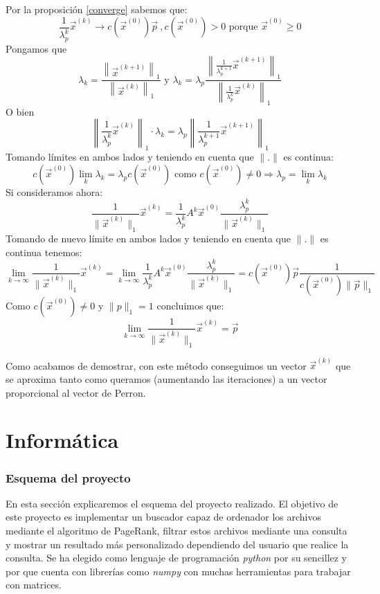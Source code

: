 \documentclass[size=a4, parskip=half, titlepage=false, toc=flat, toc=bib, 12pt]{scrartcl}
\theoremstyle{theorem-style}
\theoremstyle{definition-style}
\theoremstyle{remark-style}
\theoremstyle{example-style}
\theoremstyle{definition-style}
\theoremstyle{remark-style}
\begin{document}
Por la proposición \ref{converge} sabemos que:
$$\frac{1}{\lambda_p^k} \vec{x}^{(k)} \rightarrow c(\vec{x}^{(0)})\vec{p} \ , c(\vec{x}^{(0)}) > 0 \textrm{ porque } \vec{x}^{(0)} \geq 0$$
Pongamos que
$$\lambda_k = \frac{\left\|\vec{x}^{(k+1)}\right\|_1}{\left\|\vec{x}^{(k)}\right\|_1} \textrm{ y } \lambda_k = \lambda_p \frac{\left\|\frac{1}{\lambda_p^{k+1}} \vec{x}^{(k+1)}\right\|_1}{\left\|\frac{1}{\lambda_p^k} \vec{x}^{(k)}\right\|_1}$$
O bien
$$\left\|\frac{1}{\lambda_p^k} \vec{x}^{(k)} \right\|_1 \cdot \lambda_k  = \lambda_p \left\| \frac{1}{\lambda_p^{k+1}} \vec{x}^{(k+1)} \right\|_1$$
Tomando límites en ambos lados y teniendo en cuenta que $\|.\|$ es continua:
$$c(\vec{x}^{(0)}) \lim_{k} \lambda_k = \lambda_p c(\vec{x}^{(0)}) \textrm{ como } c(\vec{x}^{(0)}) \neq 0  \Rightarrow \lambda_p = \lim_{k} \lambda_k $$
Si consideramos ahora:
$$\frac{1}{\|\vec{x}^{(k)}\|_1} \vec{x}^{(k)}= \frac{1}{\lambda_p^{k}} A^k \vec{x}^{(0)} \frac{\lambda_p^k}{\|\vec{x}^{(k)}\|_1} $$
Tomando de nuevo límite en ambos lados y teniendo en cuenta que $\|. \|$ es continua tenemos:
$$\lim_{k \to \infty} \frac{1}{\|\vec{x}^{(k)}\|_1} \vec{x}^{(k)}= \lim_{k \to \infty} \frac{1}{\lambda_p^k} A^k \vec{x}^{(0)} \frac{\lambda_p^k}{\|\vec{x}^{(k)}\|_1} = c(\vec{x}^{(0)}) \vec{p} \frac{1}{c(\vec{x}^{(0)}) \|\vec{p}\|_1} $$
Como $c(\vec{x}^{(0)}) \neq 0$ y $\|p \|_1 = 1$ concluimos que:
$$\lim_{k \to \infty} \frac{1}{\|\vec{x}^{(k)}\|_1} \vec{x}^{(k)} = \vec{p} $$

Como acabamos de demostrar, con este método conseguimos un vector $\vec{x}^{(k)}$ que se aproxima tanto como queramos (aumentando las iteraciones) a un vector proporcional al vector de Perron.

\newpage

\part{Informática}

\section{Esquema del proyecto}
En esta sección explicaremos el esquema del proyecto realizado. El objetivo de este proyecto es implementar un buscador capaz de ordenador los archivos mediante el algoritmo de PageRank, filtrar estos archivos mediante una consulta y mostrar un resultado más personalizado dependiendo del usuario que realice la consulta. Se ha elegido como lenguaje de programación \textit{python} por su sencillez y por que cuenta con librerías como \textit{numpy} con muchas herramientas para trabajar con matrices.
\end{document}

